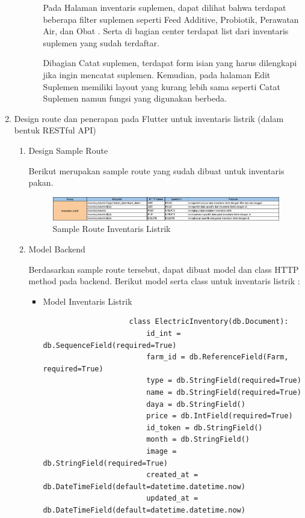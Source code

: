 \begin{spacing}{1.5}
\begin{enumerate}
\begin{enumerate}
\begin{itemize}
				Pada Halaman inventaris suplemen, dapat dilihat bahwa terdapat beberapa filter suplemen seperti Feed Additive, Probiotik, Perawatan Air, dan Obat . Serta di bagian center terdapat list dari inventaris suplemen yang sudah terdaftar.

				Dibagian Catat suplemen, terdapat form isian yang harus dilengkapi jika ingin mencatat suplemen. Kemudian, pada halaman Edit Suplemen memiliki layout yang kurang lebih sama seperti Catat Suplemen namun fungsi yang digunakan berbeda.
			\end{itemize}
		\end{enumerate}

		\item Design route dan penerapan pada Flutter untuk inventaris listrik (dalam bentuk RESTful API) 
		
		\begin{enumerate}
			\item Design Sample Route
			
			Berikut merupakan sample route yang sudah dibuat untuk inventaris pakan.

			\begin{figure}[H]
				\centering
				\includegraphics[width=1\textwidth]{gambar/sprint4/sample_route_electric.png}
				\caption{Sample Route Inventaris Listrik}
			\end{figure}

			\item Model Backend
 			
			Berdasarkan sample route tersebut, dapat dibuat model dan class HTTP method pada backend. Berikut model serta class untuk inventaris listrik :

			\begin{itemize}
				\item Model Inventaris Listrik
				
				\begin{lstlisting}
					class ElectricInventory(db.Document):
						id_int = db.SequenceField(required=True)
						farm_id = db.ReferenceField(Farm, required=True)
						type = db.StringField(required=True)
						name = db.StringField(required=True)
						daya = db.StringField()
						price = db.IntField(required=True)
						id_token = db.StringField()
						month = db.StringField()
						image = db.StringField(required=True)
						created_at = db.DateTimeField(default=datetime.datetime.now)
						updated_at = db.DateTimeField(default=datetime.datetime.now)
				\end{lstlisting}


\end{itemize}
\end{enumerate}
\end{enumerate}
\end{spacing}
